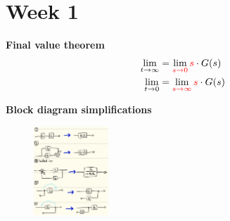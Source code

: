 \section{Week 1}
\textbf{\large Final value theorem}
\begin{align*}
    \lim_{t\to \infty} &= \lim_{\color{red} s\to 0} \color{red} s \color{black} \cdot G(s) \\
    \lim_{t\to 0} &= \lim_{\color{red} s\to \infty} \color{red} s \color{black} \cdot G(s)
\end{align*}

\textbf{\large Block diagram simplifications}
\begin{figure}[H]
    \centering
    \includegraphics[width=0.25\textwidth]{images/block_diagram_simplification.png}
\end{figure}